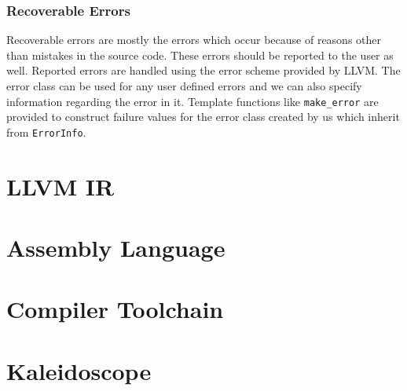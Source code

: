 \documentclass[12pt]{article}
\newcommand{\code}{\texttt}
\begin{document}
\subsubsection{Recoverable Errors}
Recoverable errors are mostly the errors which occur because of reasons other than mistakes in the source code. These errors should be reported to the user as well. Reported errors are handled using the error scheme provided by LLVM. The error class can be used for any user defined errors and we can also specify information regarding the error in it. Template functions like \code{make\_error} are provided to construct failure values for the error class created by us which inherit from \code{ErrorInfo}.
\section{LLVM IR}
\section{Assembly Language}
\section{Compiler Toolchain}
\section{Kaleidoscope}
\end{document}
